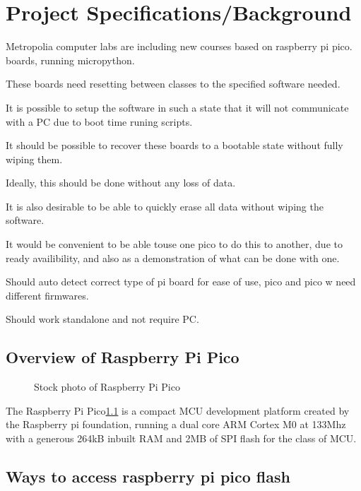 \vspace{21.5pt}
\chapter{Project Specifications/Background}

Metropolia computer labs are including new courses based on raspberry pi pico. boards, running micropython.

These boards need resetting between classes to the specified software needed.

It is possible to setup the software in such a state that it will not communicate with a PC due to boot time runing scripts.

It should be possible to recover these boards to a bootable state without fully wiping them.

Ideally, this should be done without any loss of data.

It is also desirable to be able to quickly erase all data without wiping the software.

It would be convenient to be able touse one pico to do this to another, due to ready availibility, and also as a demonstration of what can be done with one.

Should auto detect correct type of pi board for ease of use, pico and pico w need different firmwares.

Should work standalone and not require PC.

\section{Overview of Raspberry Pi Pico}

\begin{figure}[ht]
	\centering
	\caption{Stock photo of Raspberry Pi Pico}
	\label{fig:picostock}
\end{figure}

The Raspberry Pi Pico\ref{fig:picostock} is a compact MCU development platform created by the Raspberry pi foundation, running a dual core ARM Cortex M0 at 133Mhz with a generous 264kB inbuilt RAM and 2MB of SPI flash for the class of MCU\cite{ltdRaspberryPiPico}.

\pagebreak
\section{Ways to access raspberry pi pico flash}

